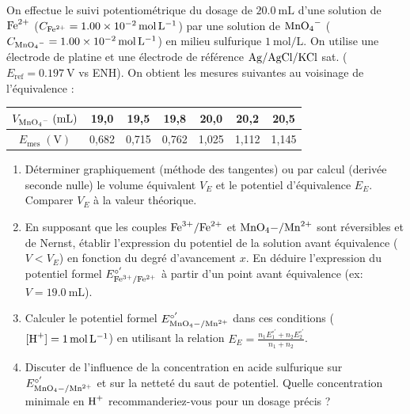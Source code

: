 \documentclass[11pt]{article}
\begin{document}
\begin{exercice}
On effectue le suivi potentiométrique du dosage de $\SI{20,0}{\mL}$ d'une solution de $\ce{Fe^{2+}}$ ($C_{\ce{Fe^{2+}}} = \SI{1,00e-2}{\mol\per\L}$) par une solution de $\ce{MnO4-}$ ($C_{\ce{MnO4-}} = \SI{1,00e-2}{\mol\per\L}$) en milieu sulfurique $\SI{1}{\mol\per\L}$. On utilise une électrode de platine et une électrode de référence $\ce{Ag/AgCl/KCl}$ sat. ($E_{\text{ref}} = \SI{0,197}{\V}$ vs ENH). On obtient les mesures suivantes au voisinage de l'équivalence :
\begin{center}
\begin{tabular}{c|cccccc}
$V_{\ce{MnO4-}}\;(\si{\mL})$ & 19,0 & 19,5 & 19,8 & 20,0 & 20,2 & 20,5 \\
\hline
$E_{\text{mes}}\;(\si{\V})$ & 0,682 & 0,715 & 0,762 & 1,025 & 1,112 & 1,145 \\
\end{tabular}
\end{center}
\begin{enumerate}
    \item Déterminer graphiquement (méthode des tangentes) ou par calcul (derivée seconde nulle) le volume équivalent $V_E$ et le potentiel d'équivalence $E_E$. Comparer $V_E$ à la valeur théorique.
    \item En supposant que les couples $\ce{Fe^{3+}/Fe^{2+}}$ et $\ce{MnO4-/Mn^{2+}}$ sont réversibles et de Nernst, établir l'expression du potentiel de la solution avant équivalence ($V < V_E$) en fonction du degré d'avancement $x$. En déduire l'expression du potentiel formel $E^{\circ'}_{\ce{Fe^{3+}/Fe^{2+}}}$ à partir d'un point avant équivalence (ex: $V = \SI{19,0}{\mL}$).
    \item Calculer le potentiel formel $E^{\circ'}_{\ce{MnO4-/Mn^{2+}}}$ dans ces conditions ($[\ce{H+}] = \SI{1}{\mol\per\L}$) en utilisant la relation $E_E = \frac{n_1 E^{\circ'}_1 + n_2 E^{\circ'}_2}{n_1 + n_2}$.
    \item Discuter de l'influence de la concentration en acide sulfurique sur $E^{\circ'}_{\ce{MnO4-/Mn^{2+}}}$ et sur la netteté du saut de potentiel. Quelle concentration minimale en $\ce{H+}$ recommanderiez-vous pour un dosage précis ?
\end{enumerate}
\end{exercice}
\end{document}
